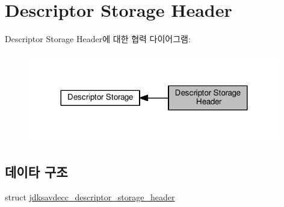 \hypertarget{group__descriptor__storage__header}{}\section{Descriptor Storage Header}
\label{group__descriptor__storage__header}
Descriptor Storage Header에 대한 협력 다이어그램\+:
\nopagebreak
\begin{figure}[H]
\begin{center}
\leavevmode
\includegraphics[width=312pt]{group__descriptor__storage__header}
\end{center}
\end{figure}
\subsection*{데이타 구조}
\begin{DoxyCompactItemize}
\item 
struct \hyperlink{structjdksavdecc__descriptor__storage__header}{jdksavdecc\+\_\+descriptor\+\_\+storage\+\_\+header}
\end{DoxyCompactItemize}
